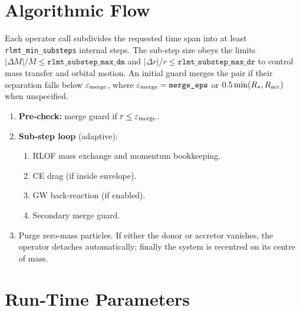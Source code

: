 \documentclass[11pt]{article}
\begin{document}
\section{Algorithmic Flow}

Each operator call subdivides the requested time span into at least
\texttt{rlmt\_min\_substeps} internal steps.  The sub‑step size obeys the
limits $|\Delta M|/M\le\texttt{rlmt\_substep\_max\_dm}$ and
$|\Delta r|/r\le\texttt{rlmt\_substep\_max\_dr}$ to control mass transfer and
orbital motion.  An initial guard merges the pair if their separation falls
below $\varepsilon_{\rm merge}$, where
$\varepsilon_{\rm merge}=\texttt{merge\_eps}$ or
$0.5\min(R_{*},R_{\rm acc})$ when unspecified.

\begin{enumerate}[nosep]
\item \textbf{Pre‑check:} merge guard if $r\le\varepsilon_{\rm merge}$.
\item \textbf{Sub‑step loop} (adaptive):
  \begin{enumerate}[nosep]
    \item RLOF mass exchange and momentum bookkeeping.
    \item CE drag (if inside envelope).
    \item GW back‑reaction (if enabled).
    \item Secondary merge guard.
  \end{enumerate}
\item Purge zero‑mass particles.  If either the donor or accretor vanishes,
      the operator detaches automatically; finally the system is recentred on
      its centre of mass.
\end{enumerate}

\section{Run‑Time Parameters}
\label{sec:param_table}
\end{document}
